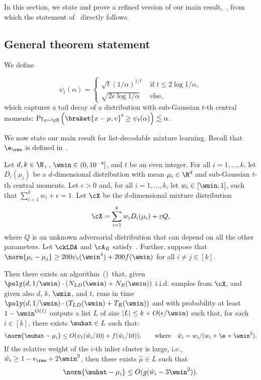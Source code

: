 In this section, we state and prove a refined version of our main result,~, from which the statement of~ directly follows.

\subsection{General theorem statement}
\label{sec:fulltheorem}
We define 

\begin{equation}
\label{eq:psifunction}
    \psi_t(\alpha) = \begin{cases}
    \sqrt{t}(1/\alpha)^{1/t} & \text{ if } t \leq 2 \log 1/\alpha,\\
    \sqrt{2e \log 1/\alpha} & \text{ else},
\end{cases}
\end{equation}
which captures a tail decay of a distribution with sub-Gaussian \(t\)-th central moments: \(\Pr_{x \sim \cD} \left(\braket{x - \mu, v}^t  \geq \psi_t(\alpha) \right) \lesssim \alpha \).

We now state our main result for list-decodable mixture learning. Recall that \(\e_{\rme}\) is defined in~.

\begin{theorem}
    \label{thm:main-technical}
Let $d, k \in \N_+$, $\wmin \in (0, 10^{-4}]$, and $t$ be an even integer. 
For all $i = 1, \ldots, k$, let $D_i(\mu_i)$ be a $d$-dimensional distribution with mean $\mu_i \in \R^d$ and sub-Gaussian $t$-th central moments.  
Let $\epsilon > 0$ and, for all $i = 1, \ldots, k$, let $w_i \in [\wmin, 1]$, such that $\sum_{i=1}^k w_i + \epsilon = 1$.
Let $\cX$ be the $d$-dimensional mixture distribution 
\[\cX = \sum_{i=1}^k w_i D_i(\mu_i) + \varepsilon Q,\]
where $Q$ is an unknown adversarial distribution that can depend on all the other parameters. Let \(\ckLDA\) and \(\cA_R\) satisfy~.
Further, suppose that $\norm{\mu_i - \mu_j} \geq 200\psi_t(\wmin^4) + 200f(\wmin)$ for all $i \neq j \in [k]$.

Then there exists an algorithm~()~that, given ${\poly(d, 1/\wmin) \cdot (N_{LD}(\wmin) + N_R(\wmin))}$ i.i.d. samples from $\cX$, and given also $d$, $k$, $\wmin$, and $t$, runs in time ${\poly(d, 1/\wmin) \cdot (T_{LD}(\wmin) + T_R(\wmin))}$ and with probability at least $1-\wmin^{O(1)}$ outputs a list $L$ of size ${|L| \leq k + O(\epsilon/\wmin)}$ such that, for each \(i \in [k]\), there exists \(\muhat \in L\) such that:
    \[\norm{\muhat - \mu_i} \leq O(\psi_t(\tilde{w}_i/10)+f(\tilde{w}_i/10)), \qquad \text{where} \quad \tilde w_i = w_i / (w_i + \e + \wmin^2).\]
If the relative weight of the \(i\)-th inlier cluster is large, i.e., 
 $\tilde{w}_i \geq 1-\epsilon_{\rme} + 2\wmin^2$, then there exists $\hat\mu \in L$ such that
    \[\norm{\muhat - \mu_i} \leq O(g(\tilde{w}_i - 3\wmin^2)).\]
\end{theorem}

